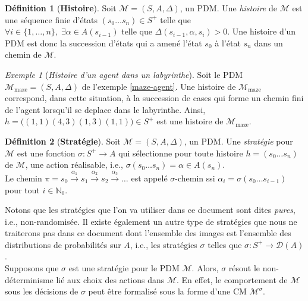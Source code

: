 \documentclass[12pt,a4paper]{report}
\theoremstyle{definition}%
\newtheorem{definition}{Définition}[chapter]
\theoremstyle{remark}
\newtheorem{example}{Exemple}[chapter]
\begin{document}
\begin{definition}[\textbf{Histoire}]
	Soit $\mathcal{M} = (S, A, \Delta)$, un PDM. Une \textit{histoire} de $\mathcal{M}$
	est une séquence finie d'états $(s_0 \dots s_n) \in S^+$ telle que
	$\forall i \in \{1, \dots, n \}, \; \exists \alpha \in A(s_{i-1})$ telle que $\Delta(s_{i-1}, \alpha, s_i) > 0$.
	Une histoire d'un PDM est donc la succession d'états qui a amené l'état $s_0$ à l'état $s_n$ dans
	un chemin de $\mathcal{M}$.
\end{definition}

\begin{example}[\textit{Histoire d'un agent dans un labyrinthe}]
	Soit le PDM $\mathcal{M}_{\text{maze}} = (S, A, \Delta)$ de l'exemple \ref{maze-agent}.
	Une histoire de $\mathcal{M}_{\text{maze}}$ correspond, dans cette situation,
	à la succession de cases qui forme un chemin fini de l'agent lorsqu'il se deplace dans le
	labyrinthe. Ainsi,
	$
		h = \big( (1, 1) (4, 3) (1, 3) (1, 1) \big) \in S^+
	$
	est une histoire de $\mathcal{M}_{\text{maze}}$.
\end{example}

\begin{definition}[\textbf{Stratégie}]
	Soit $\mathcal{M} = (S, A, \Delta)$, un PDM. Une \textit{stratégie} pour $\mathcal{M}$
	est une fonction
	$\sigma : S^+ \rightarrow A$
	qui sélectionne pour toute histoire $h = (s_0 \dots s_n)$ de $\mathcal{M}$, une action réalisable, i.e., $\sigma(s_0 \dots s_n) = \alpha \in A(s_n)$.
	\\Le chemin $\pi = s_0 \xrightarrow{\alpha_1} s_1 \xrightarrow{\alpha_2} s_2 \xrightarrow{\alpha_3} \dots$
	est appelé $\sigma$-chemin ssi $\alpha_i = \sigma(s_0 \dots s_{i-1})$
	pour tout $i \in \mathbb{N}_0$.
\end{definition}
	Notons que les stratégies que l'on va utiliser dans ce document sont dites \textit{pures}, i.e., non-randomisée. Il existe également un autre type de
	stratégies que nous ne traiterons pas dans ce document dont l'ensemble des
	images est l'ensemble des distributions de probabilités sur $A$, i.e., les stratégies $\sigma$ telles que $\sigma: S^+ \rightarrow \mathcal{D}(A)$. \\

Supposons que $\sigma$ est une stratégie pour le PDM $\mathcal{M}$. Alors,
$\sigma$ résout le non-déterminisme lié aux choix des actions dans $\mathcal{M}$.
En effet, le comportement de $\mathcal{M}$ sous les décisions de $\sigma$
peut être formalisé sous la forme d'une CM $\mathcal{M}^{\sigma}$.
\end{document}
